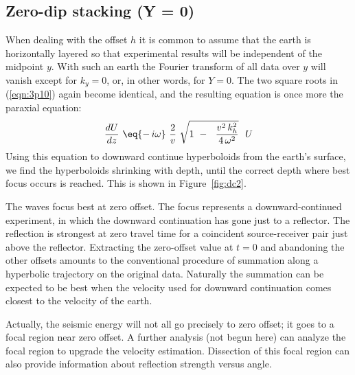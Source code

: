 \subsection{Zero-dip stacking (Y = 0)}
\par
When dealing with the offset  $h$  it is common to assume that
the earth is horizontally layered so that experimental results will be
independent of the midpoint  $y$.
With such an earth the Fourier transform of all data over  $y$  will
vanish except for  $ k_y = 0 $,
or, in other words, for  $Y  =  0$.
The two square roots in (\ref{eqn:3p10})
again become identical,
and the resulting equation is once more the paraxial equation:
\begin{equation}
{dU \over dz }\  \eq 
{ - \, i \omega } \ {2 \over v }\ \sqrt  { 1 \ -\ 
\  { v^2 \, k_h^2   \over  4\,\omega^2 } } \  \  U
\label{eqn:4p3}
\end{equation}
Using this equation to downward continue hyperboloids from the
earth's surface, we find the hyperboloids shrinking with depth, until the
correct depth where best focus occurs is reached.
This is shown in Figure~\ref{fig:dc2}.
\par
The waves focus best at zero offset.
The focus represents a downward-continued experiment,
in which the downward continuation has gone just to a reflector.
The reflection is strongest at zero travel time for
a coincident source-receiver pair just above the reflector.
Extracting the zero-offset value at  $t = 0$  and
abandoning the other offsets amounts
to the conventional procedure of summation along
a hyperbolic trajectory on the original data.
Naturally the summation can be expected to be best
when the velocity used for downward continuation
comes closest to the velocity of the earth.

\par
Actually, the seismic energy will not all go precisely to zero offset;
it goes to a focal region near zero offset.
A further analysis (not begun here) can analyze the focal region
to upgrade the velocity estimation.   Dissection of this focal region
can also provide information about reflection strength versus angle.


